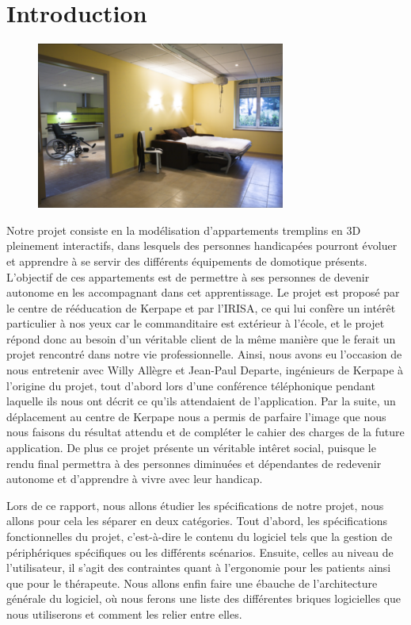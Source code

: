 \section{Introduction}

\begin{figure}
	\centering
	\includegraphics[scale=1]{1-PreEtude/img/appt_tremplin_intro.png}
\end{figure}


Notre projet consiste en la modélisation d'appartements tremplins en 3D pleinement interactifs, dans lesquels des personnes handicapées pourront évoluer et apprendre à se servir des différents équipements de domotique présents. L'objectif de ces appartements est de permettre à ses personnes de devenir autonome en les accompagnant dans cet apprentissage.
Le projet est proposé par le centre de rééducation de Kerpape et par l'IRISA, ce qui lui confère un intérêt particulier à nos yeux car le commanditaire est extérieur à l'école, et le projet répond donc au besoin d'un véritable client de la même manière que le ferait un projet rencontré dans notre vie professionnelle. 
Ainsi, nous avons eu l'occasion de nous entretenir avec Willy Allègre et Jean-Paul Departe, ingénieurs de Kerpape à l'origine du projet, tout d'abord lors d'une conférence téléphonique pendant laquelle ils nous ont décrit ce qu'ils attendaient de l'application. Par la suite, un déplacement au centre de Kerpape nous a permis de parfaire l'image que nous nous faisons du résultat attendu et de compléter le cahier des charges de la future application. 
De plus ce projet présente un véritable intêret social, puisque le rendu final permettra à des personnes diminuées et dépendantes de redevenir autonome et d'apprendre à vivre avec leur handicap.
\newline

Lors de ce rapport, nous allons étudier les spécifications de notre projet, nous allons pour cela les séparer en deux catégories. Tout d'abord, les spécifications fonctionnelles du projet, c'est-à-dire le contenu du logiciel tels que la gestion de périphériques spécifiques ou les différents scénarios. Ensuite, celles au niveau de l'utilisateur, il s'agit des contraintes quant à l'ergonomie pour les patients ainsi que pour le thérapeute. Nous allons enfin faire une ébauche de l'architecture générale du logiciel, où nous ferons une liste des différentes briques logicielles que nous utiliserons et comment les relier entre elles.


